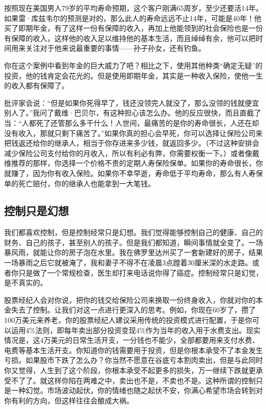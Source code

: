 按照现在美国男人79岁的平均寿命预期，这个客户刚满65周岁，至少还要活14年。如果雷·库兹韦尔的预测是对的，那么此人的寿命远远不止14年，可能是40年！他买了即期年金，有了这样一份有保障的收入，再加上他能领到的社会保险也是一份有保障的收入，这样他的收入足以维持他的基本生活，而且绰绰有余，他可以把时间用来关注对于他来说最重要的事情——孙子孙女，还有钓鱼。

你在这个案例中看到年金的巨大威力了吧？相比之下，使用其他种类“确定无疑”的投资，他的钱肯定会花光的。但是使用即期年金，其实是一种收入保险，使他一生的收入都有保障了。

批评家会说：“但是如果你死得早了，钱还没领完人就没了，那么没领的钱就便宜别人了。”我问了戴维·巴贝尔，有这种担心该怎么办。他的反应很快，而且直截了当：“人都死了还管那么多干什么！人世间，最痛苦的是你的寿命很长，人还在却没有收入，那就只剩下痛苦了。”如果你真的担心会早死，你可以选择让保险公司来把钱返还给你的继承人，相当于你存进来多少钱，就返回多少。（不过这种安排会减少保险公司支付给你的月收入，所以有利必有弊，你需要权衡一下。）或者像戴维推荐的那样，你选择一个价格不贵的定期人寿保险保单。如果你的寿命很长，你就赚了，因为你有收入保险。如果你不幸早逝，寿命低于平均寿命，那么有人寿保单的死亡赔付，你的继承人也能拿到一大笔钱。

\subsection{控制只是幻想}

我们都喜欢控制，但是控制经常只是幻想。我们觉得能够控制自己的健康、自己的财务、自己的孩子，甚至别人的孩子。但是我们都知道，瞬间事情就全变了。一场暴风雨，就能让你的房子泡在水里。我在佛罗里达州买了一套新建好的房子，结果一场暴雨之后它就被淹了，我和妻子不得不在凌晨3点蹚着30厘米深的水走路。或者你只是做了一个常规检查，医生却打来电话说你得了癌症。控制经常只是幻觉，是不真实的。

股票经纪人会对你说，把你的钱交给保险公司来换取一份终身收入，你就对你的本金失去了控制。让我们对这一点进行更深入的思考。例如，你现在60岁了，攒了100万美元来养老，你的股票经纪人建议采用传统的投资模式进行配置，于是你可以运用4\%法则，即每年卖出部分投资变现4\%作为当年的收入用于水费支出。现实情况是，这4万美元的日常生活开支，一分钱也不能少，全部都要用来支付水费、电费等基本生活开支。你知道你的钱需要用于投资，但是你根本承受不了本金发生亏损。如果股市下跌了怎么办？你当然不愿意在谷底亏本割肉卖出，但是与此同时你又觉得，人生到了这个阶段，你根本承受不起更多的损失，万一继续下跌就更承受不了了。就这样你陷在两难之中，卖出也不是，不卖也不是。这种所谓的控制只是一种幻觉。市场波动起伏，你的情绪也随之起伏不安，你满心希望市场会转到对你有利的方向，但这样往往会酿成大祸。

